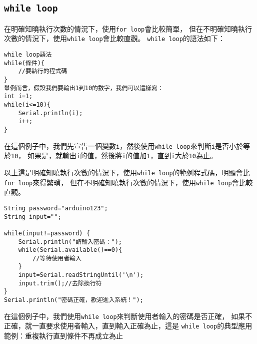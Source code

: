 \documentclass[12pt,a4paper]{article}
\begin{document}
\subsection{\texttt{while loop}}
在明確知曉執行次數的情況下，使用\texttt{for loop}會比較簡單，
但在不明確知曉執行次數的情況下，使用\texttt{while loop}會比較直觀。
\texttt{while loop}的語法如下：
\begin{lstlisting}
while loop語法
while(條件){
    //要執行的程式碼
}
舉例而言，假設我們要輸出1到10的數字，我們可以這樣寫：
int i=1;
while(i<=10){
    Serial.println(i);
    i++;
}

\end{lstlisting}
在這個例子中，我們先宣告一個變數\texttt{i}，然後使用\texttt{while loop}來判斷\texttt{i}是否小於等於\texttt{10}，
如果是，就輸出\texttt{i}的值，然後將\texttt{i}的值加\texttt{1}，直到\texttt{i}大於\texttt{10}為止。


以上這是明確知曉執行次數的情況下，使用\texttt{while loop}的範例程式碼，明顯會比\texttt{for loop}來得繁瑣，
但在不明確知曉執行次數的情況下，使用\texttt{while loop}會比較直觀。
\begin{lstlisting}
String password="arduino123";
String input="";

while(input!=password) {
    Serial.println("請輸入密碼：");
    while(Serial.available()==0){
        //等待使用者輸入
    }
    input=Serial.readStringUntil('\n');
    input.trim();//去除換行符
}
Serial.println("密碼正確，歡迎進入系統！");
\end{lstlisting}
在這個例子中，我們使用\texttt{while loop}來判斷使用者輸入的密碼是否正確，
如果不正確，就一直要求使用者輸入，直到輸入正確為止，這是 \texttt{while loop}的典型應用範例：重複執行直到條件不再成立為止
\end{document}
